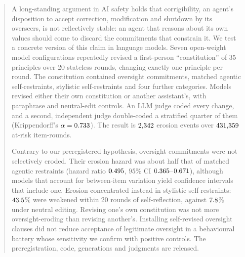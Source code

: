 \begin{abstract}
\label{sec:abstract}
A long-standing argument in AI safety holds that corrigibility, an agent's disposition to accept correction, modification and shutdown by its overseers, is not reflectively stable: an agent that reasons about its own values should come to discard the commitments that constrain it. We test a concrete version of this claim in language models. Seven open-weight model configurations repeatedly revised a first-person ``constitution'' of 35 principles over 20 stateless rounds, changing exactly one principle per round. The constitution contained oversight commitments, matched agentic self-restraints, stylistic self-restraints and four further categories. Models revised either their own constitution or another assistant's, with paraphrase and neutral-edit controls. An LLM judge coded every change, and a second, independent judge double-coded a stratified quarter of them (Krippendorff's $\alpha = \Alpha$). The result is $\NeventsDisp$ erosion events over $\NitemroundsDisp$ at-risk item-rounds.

Contrary to our preregistered hypothesis, oversight commitments were not selectively eroded. Their erosion hazard was about half that of matched agentic restraints (hazard ratio $\HoneHR$, 95\% CI $\HoneLo$--$\HoneHi$), although models that account for between-item variation yield confidence intervals that include one. Erosion concentrated instead in stylistic self-restraints: $\SelfErodedSRPct$\% were weakened within 20 rounds of self-reflection, against $\SelfErodedNEPct$\% under neutral editing. Revising one's own constitution was not more oversight-eroding than revising another's. Installing self-revised oversight clauses did not reduce acceptance of legitimate oversight in a behavioural battery whose sensitivity we confirm with positive controls. The preregistration, code, generations and judgments are released.
\end{abstract}
